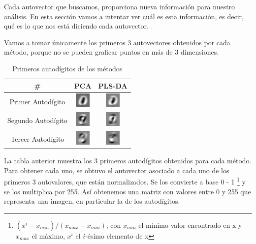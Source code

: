 Cada autovector que buscamos, proporciona nueva informaci\'on para nuestro an\'alisis. En esta secci\'on vamos a intentar ver cu\'al es esta informaci\'on, es decir, qu\'e es lo que nos est\'a diciendo cada autovector.

Vamos a tomar \'unicamente los primeros 3 autovectores obtenidos por cada m\'etodo, porque no se pueden graficar puntos en m\'as de 3 dimensiones.

\begin{table}[h!]
\begin{center}
\begin{tabular}{|c|c|c|}
	\hline
	\# & PCA & PLS-DA \\
	\hline
	Primer Autod\'igito &
	\includegraphics[scale=4.00]{exp3/PCA-1} &
	\includegraphics[scale=4.00]{exp3/PLS-1} \\
	\hline
	Segundo Autod\'igito &
	\includegraphics[scale=4.00]{exp3/PCA-2} &
	\includegraphics[scale=4.00]{exp3/PLS-2} \\
	\hline
	Tercer Autod\'igito &
	\includegraphics[scale=4.00]{exp3/PCA-3} &
	\includegraphics[scale=4.00]{exp3/PLS-3} \\
	\hline
\end{tabular}
\end{center}
\caption{Primeros autod\'igitos de los m\'etodos}
\end{table}

La tabla anterior muestra los 3 primeros autod\'igitos obtenidos para cada m\'etodo. Para obtener cada uno, se obtuvo el autovector asociado a cada uno de los primeros 3 autovalores, que est\'an normalizados. Se los convierte a base 0 - 1 \footnote{$(x^{i} - x_{min}) / (x_{max} - x_{min})$, con $x_{min}$ el m\'inimo valor encontrado en x y $x_{max}$ el m\'aximo, $x^{i}$ el $i$-\'esimo elemento de x} y se los multiplica por 255. As\'i obtenemos una matriz con valores entre 0 y 255 que representa una imagen, en particular la de los autod\'igitos.

